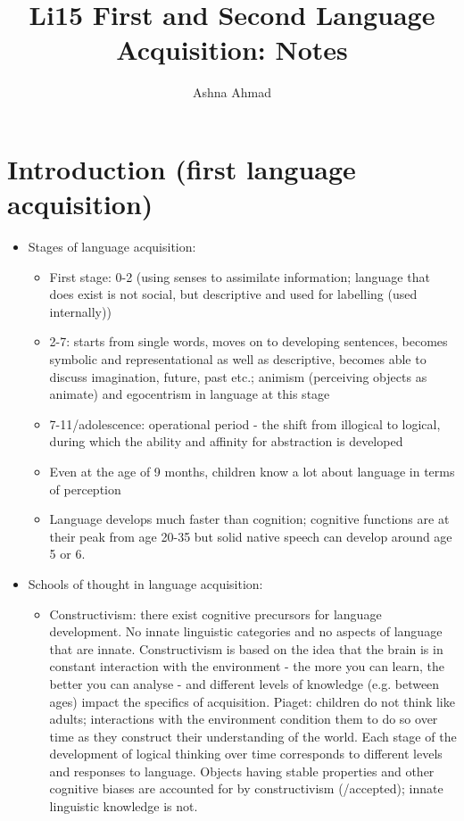 \documentclass{article}
\title{Li15 First and Second Language Acquisition: Notes}
\author{Ashna Ahmad}
\begin{document}
\maketitle

\tableofcontents

\section{Introduction (first language acquisition)}
\begin{itemize}
    \item Stages of language acquisition:
    \begin{itemize}
        \item First stage: 0-2 (using senses to assimilate information; language that does exist is not social, but descriptive and used for labelling (used internally))
        \item 2-7: starts from single words, moves on to developing sentences, becomes symbolic and representational as well as descriptive, becomes able to discuss imagination, future, past etc.; animism (perceiving objects as animate) and egocentrism in language at this stage
        \item 7-11/adolescence: operational period - the shift from illogical to logical, during which the ability and affinity for abstraction is developed
        \item Even at the age of 9 months, children know a lot about language in terms of perception
        \item Language develops much faster than cognition; cognitive functions are at their peak from age 20-35 but solid native speech can develop around age 5 or 6.
    \end{itemize}
    \item Schools of thought in language acquisition:
    \begin{itemize}
        \item Constructivism: there exist cognitive precursors for language development. No innate linguistic categories and no aspects of language that are innate. Constructivism is based on the idea that the brain is in constant interaction with the environment - the more you can learn, the better you can analyse - and different levels of knowledge (e.g. between ages) impact the specifics of acquisition. Piaget: children do not think like adults; interactions with the environment condition them to do so over time as they construct their understanding of the world. Each stage of the development of logical thinking over time corresponds to different levels and responses to language. Objects having stable properties and other cognitive biases are accounted for by constructivism (/accepted); innate linguistic knowledge is not.

\end{itemize}
\end{itemize}
\end{document}
